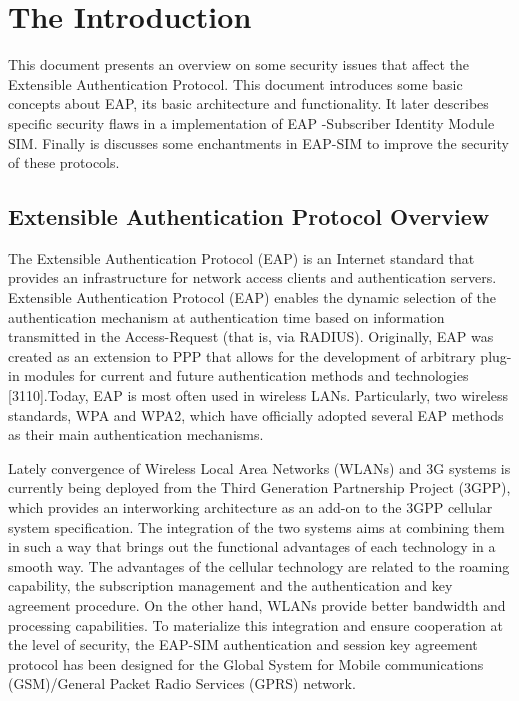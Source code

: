 \chapter{The Introduction}

This document presents an overview on some security issues that affect the Extensible Authentication Protocol.
This document introduces some basic concepts about EAP, its basic architecture and functionality. It later describes specific security flaws in a implementation of EAP -Subscriber Identity Module SIM. Finally is discusses some enchantments in EAP-SIM to improve the security of these protocols. 
 
\section{Extensible Authentication Protocol Overview} 

The Extensible Authentication Protocol (EAP) is an Internet standard that provides an infrastructure for network access clients and authentication servers. Extensible Authentication Protocol (EAP) enables the dynamic selection of the authentication mechanism at authentication time based on information transmitted in the Access-Request (that is, via RADIUS). Originally, EAP was created as an extension to PPP that allows for the development of arbitrary 
plug-in modules for current and future authentication methods and technologies [3110].Today, EAP is most often used in wireless LANs. Particularly, two wireless standards, WPA and WPA2, which have officially adopted several EAP 
methods as their main authentication mechanisms. 

Lately convergence of Wireless Local Area Networks (WLANs) and 3G systems is currently being deployed from the Third Generation Partnership Project (3GPP), which provides an interworking architecture as an add-on to the 3GPP cellular system specification. The integration of the two systems aims at combining them in such a way that brings out the functional advantages of each technology in a smooth way. The advantages of the cellular technology are related to the roaming capability, the subscription management and the authentication and key agreement procedure. On the other hand, WLANs provide better bandwidth and processing capabilities. To materialize this integration and ensure cooperation at the level of security, the EAP-SIM authentication and session key agreement protocol has been designed for the Global System for Mobile communications (GSM)/General Packet Radio Services (GPRS) network.

